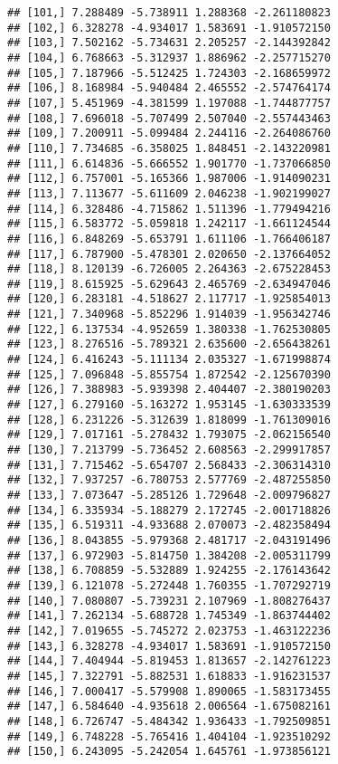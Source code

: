 \documentclass[
]{article}
\begin{document}
\begin{verbatim}
## [101,] 7.288489 -5.738911 1.288368 -2.261180823
## [102,] 6.328278 -4.934017 1.583691 -1.910572150
## [103,] 7.502162 -5.734631 2.205257 -2.144392842
## [104,] 6.768663 -5.312937 1.886962 -2.257715270
## [105,] 7.187966 -5.512425 1.724303 -2.168659972
## [106,] 8.168984 -5.940484 2.465552 -2.574764174
## [107,] 5.451969 -4.381599 1.197088 -1.744877757
## [108,] 7.696018 -5.707499 2.507040 -2.557443463
## [109,] 7.200911 -5.099484 2.244116 -2.264086760
## [110,] 7.734685 -6.358025 1.848451 -2.143220981
## [111,] 6.614836 -5.666552 1.901770 -1.737066850
## [112,] 6.757001 -5.165366 1.987006 -1.914090231
## [113,] 7.113677 -5.611609 2.046238 -1.902199027
## [114,] 6.328486 -4.715862 1.511396 -1.779494216
## [115,] 6.583772 -5.059818 1.242117 -1.661124544
## [116,] 6.848269 -5.653791 1.611106 -1.766406187
## [117,] 6.787900 -5.478301 2.020650 -2.137664052
## [118,] 8.120139 -6.726005 2.264363 -2.675228453
## [119,] 8.615925 -5.629643 2.465769 -2.634947046
## [120,] 6.283181 -4.518627 2.117717 -1.925854013
## [121,] 7.340968 -5.852296 1.914039 -1.956342746
## [122,] 6.137534 -4.952659 1.380338 -1.762530805
## [123,] 8.276516 -5.789321 2.635600 -2.656438261
## [124,] 6.416243 -5.111134 2.035327 -1.671998874
## [125,] 7.096848 -5.855754 1.872542 -2.125670390
## [126,] 7.388983 -5.939398 2.404407 -2.380190203
## [127,] 6.279160 -5.163272 1.953145 -1.630333539
## [128,] 6.231226 -5.312639 1.818099 -1.761309016
## [129,] 7.017161 -5.278432 1.793075 -2.062156540
## [130,] 7.213799 -5.736452 2.608563 -2.299917857
## [131,] 7.715462 -5.654707 2.568433 -2.306314310
## [132,] 7.937257 -6.780753 2.577769 -2.487255850
## [133,] 7.073647 -5.285126 1.729648 -2.009796827
## [134,] 6.335934 -5.188279 2.172745 -2.001718826
## [135,] 6.519311 -4.933688 2.070073 -2.482358494
## [136,] 8.043855 -5.979368 2.481717 -2.043191496
## [137,] 6.972903 -5.814750 1.384208 -2.005311799
## [138,] 6.708859 -5.532889 1.924255 -2.176143642
## [139,] 6.121078 -5.272448 1.760355 -1.707292719
## [140,] 7.080807 -5.739231 2.107969 -1.808276437
## [141,] 7.262134 -5.688728 1.745349 -1.863744402
## [142,] 7.019655 -5.745272 2.023753 -1.463122236
## [143,] 6.328278 -4.934017 1.583691 -1.910572150
## [144,] 7.404944 -5.819453 1.813657 -2.142761223
## [145,] 7.322791 -5.882531 1.618833 -1.916231537
## [146,] 7.000417 -5.579908 1.890065 -1.583173455
## [147,] 6.584640 -4.935618 2.006564 -1.675082161
## [148,] 6.726747 -5.484342 1.936433 -1.792509851
## [149,] 6.748228 -5.765416 1.404104 -1.923510292
## [150,] 6.243095 -5.242054 1.645761 -1.973856121
\end{verbatim}
\end{document}

